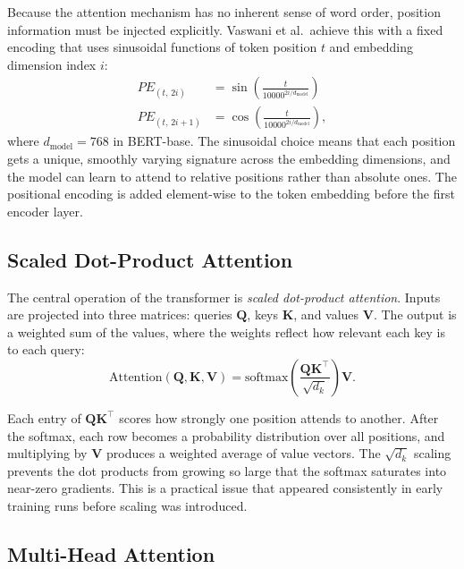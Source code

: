 Because the attention mechanism has no inherent sense of word order, position information
must be injected explicitly.
Vaswani et al.\ achieve this with a fixed encoding that uses sinusoidal functions of token
position $t$ and embedding dimension index $i$:
\begin{align}
  PE_{(t,\,2i)}   &= \sin\!\left(\frac{t}{10000^{2i/d_{\text{model}}}}\right) \\[4pt]
  PE_{(t,\,2i+1)} &= \cos\!\left(\frac{t}{10000^{2i/d_{\text{model}}}}\right),
\end{align}
where $d_{\text{model}} = 768$ in BERT-base.
The sinusoidal choice means that each position gets a unique, smoothly varying signature
across the embedding dimensions, and the model can learn to attend to relative positions
rather than absolute ones.
The positional encoding is added element-wise to the token embedding before the first
encoder layer.

\subsection{Scaled Dot-Product Attention}

The central operation of the transformer is \emph{scaled dot-product attention}.
Inputs are projected into three matrices: queries $\mathbf{Q}$, keys $\mathbf{K}$,
and values $\mathbf{V}$. The output is a weighted sum of the values, where the
weights reflect how relevant each key is to each query:
\begin{equation}
  \text{Attention}(\mathbf{Q},\mathbf{K},\mathbf{V})
  = \text{softmax}\!\left(\frac{\mathbf{Q}\mathbf{K}^{\!\top}}{\sqrt{d_k}}\right)\mathbf{V}.
  \label{eq:attention}
\end{equation}

Each entry of $\mathbf{Q}\mathbf{K}^{\!\top}$ scores how strongly one position
attends to another.
After the softmax, each row becomes a probability distribution over all positions, and
multiplying by $\mathbf{V}$ produces a weighted average of value vectors.
The $\sqrt{d_k}$ scaling prevents the dot products from growing so large that the
softmax saturates into near-zero gradients. This is a practical issue that appeared
consistently in early training runs before scaling was introduced.

\subsection{Multi-Head Attention}

